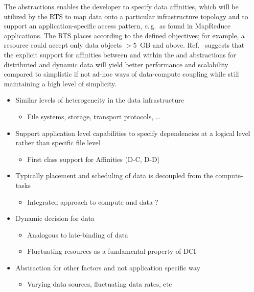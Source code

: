 \documentclass[conference]{IEEEtran}
\begin{document}
The abstractions enables the
developer to specify data affinities, which will be utilized by the RTS to
map data onto a particular infrastructure topology and to support an
application-specific access pattern, e.\,g.\ as found in MapReduce
applications. The RTS places \dataunits according to the defined
objectives; for example, a resource could accept only data objects
$>5$~GB and above.  Ref.~\cite{ddia_ptrsa10} suggests that the
explicit support for affinities between and within the \pj and \pd
abstractions for distributed and dynamic data will yield better
performance and scalability compared to simplistic if not ad-hoc ways
of data-compute coupling while still maintaining a high level of
simplicity.


\begin{itemize}

\item Similar levels of heterogeneity in the data infrastructure

\begin{itemize}
\item File systems, storage, transport protocols, …
\end{itemize}

\item Support application level capabilities to specify dependencies
  at a logical level rather than specific file level

\begin{itemize}
\item First class support for Affinities (D-C, D-D)
\end{itemize}

\item Typically placement and scheduling of data is decoupled from the compute-tasks

\begin{itemize}
\item Integrated approach to compute and data ?
\end{itemize}

\item Dynamic decision for data

\begin{itemize}
\item Analogous  to late-binding of data
\item Fluctuating resources as a fundamental property of DCI
\end{itemize}

\item Abstraction for other factors and not application specific way
\begin{itemize}
\item Varying data sources, fluctuating data rates, etc
\end{itemize}

\end{itemize}
\end{document}
